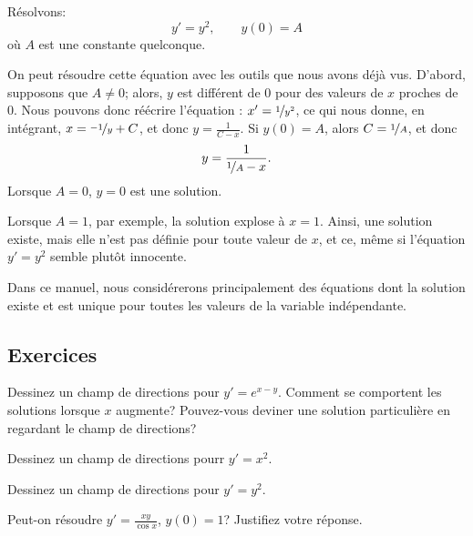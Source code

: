 \begin{example}
	Résolvons:
	\begin{equation*}
		y' = y^2, \qquad y(0) = A
	\end{equation*}
	où $A$ est une constante quelconque.

	On peut résoudre cette équation avec les outils que nous avons déjà vus.
	D'abord, supposons que $A \not= 0$;
	alors, $y$ est différent de 0 pour des valeurs de $x$ proches de 0.
	Nous pouvons donc réécrire l'équation :
		$x' = \nicefrac{1}{y^2}$, ce qui nous donne, en intégrant,
		$x = \nicefrac{-1}{y} + C$, et donc $y = \frac{1}{C-x}$.  Si $y(0) = A$, alors
		$C = \nicefrac{1}{A}$, et donc
	\begin{equation*}
		y = \frac{1}{\nicefrac{1}{A} - x} .
	\end{equation*}
	Lorsque $A=0$,  $y=0$ est une solution.

	Lorsque $A=1$, par exemple, la solution \og{}explose\fg{} à  $x=1$.
	Ainsi, une solution existe, mais elle n'est pas définie pour toute valeur de $x$,
	et ce, même si l'équation $y' = y^2$ semble plutôt innocente.
\end{example}

Dans ce manuel, nous considérerons principalement des équations dont la solution existe
et est unique pour toutes les valeurs de la variable indépendante.


\subsection{Exercices}

\begin{exercise}
	Dessinez un champ de directions pour $y'=e^{x-y}$.
	Comment se comportent les solutions lorsque $x$ augmente?
	Pouvez-vous deviner une solution particulière en regardant le champ de directions?
\end{exercise}

\begin{exercise}
	Dessinez un champ de directions pourr $y'=x^2$.
\end{exercise}

\begin{exercise}
	Dessinez un champ de directions pour $y'=y^2$.
\end{exercise}

\begin{exercise}
	Peut-on résoudre $y' = \frac{xy}{\cos x}$, $y(0) = 1$?
	Justifiez votre réponse.
\end{exercise}

